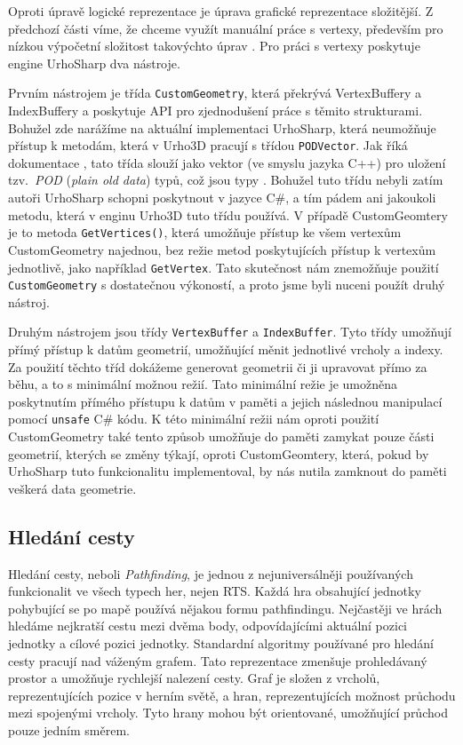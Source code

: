 Oproti úpravě logické reprezentace je úprava grafické reprezentace složitější. Z předchozí části víme, že chceme využít manuální práce s vertexy, především pro nízkou výpočetní složitost takovýchto úprav . Pro práci s vertexy poskytuje engine UrhoSharp dva nástroje. 

Prvním nástrojem je třída \texttt{CustomGeometry}, která překrývá VertexBuffery a IndexBuffery a poskytuje API pro zjednodušení práce s těmito strukturami. Bohužel zde narážíme na aktuální implementaci UrhoSharp, která neumožňuje přístup k metodám, která v Urho3D pracují s třídou \texttt{PODVector}. Jak říká dokumentace \citep{site:urho3DPOD}, tato třída slouží jako vektor (ve smyslu jazyka C++) pro uložení tzv.~\textit{POD} (\textit{plain old data}) typů, což jsou typy \textit{} . Bohužel tuto třídu nebyli zatím autoři UrhoSharp schopni poskytnout v jazyce C\#, a tím pádem ani jakoukoli metodu, která v enginu Urho3D tuto třídu používá. V případě CustomGeomtery je to metoda \texttt{GetVertices()}, která umožňuje přístup ke všem vertexům CustomGeometry najednou, bez režie metod poskytujících přístup k vertexům jednotlivě, jako například \texttt{GetVertex}. Tato skutečnost nám znemožňuje použití \texttt{CustomGeometry} s dostatečnou výkoností, a proto jsme byli nuceni použít druhý nástroj.

Druhým nástrojem jsou třídy \texttt{VertexBuffer} a \texttt{IndexBuffer}. Tyto třídy umožňují přímý přístup k datům geometrií, umožňující měnit jednotlivé vrcholy a indexy. Za použití těchto tříd dokážeme generovat geometrii či ji upravovat přímo za běhu, a to s minimální možnou režií. Tato minimální režie je umožněna poskytnutím přímého přístupu k datům v paměti a jejich následnou manipulací pomocí \texttt{unsafe} C\# kódu. K této minimální režii nám oproti použití CustomGeometry také tento způsob umožňuje do paměti zamykat pouze části geometrií, kterých se změny týkají, oproti CustomGeomtery, která, pokud by UrhoSharp tuto funkcionalitu implementoval, by nás nutila zamknout do paměti veškerá data geometrie.


\subsection{Hledání cesty}
Hledání cesty, neboli \textit{Pathfinding}, je jednou z nejuniversálněji používaných funkcionalit ve všech typech her, nejen RTS. Každá hra obsahující jednotky pohybující se po mapě používá nějakou formu pathfindingu. Nejčastěji ve hrách hledáme nejkratší cestu mezi dvěma body, odpovídajícími aktuální pozici jednotky a cílové pozici jednotky. Standardní algoritmy používané pro hledání cesty pracují nad váženým grafem. Tato reprezentace zmenšuje prohledávaný prostor a umožňuje rychlejší nalezení cesty. Graf je složen z vrcholů, reprezentujících pozice v herním světě, a hran, reprezentujících možnost průchodu mezi spojenými vrcholy. Tyto hrany mohou být orientované, umožňující průchod pouze jedním směrem.

